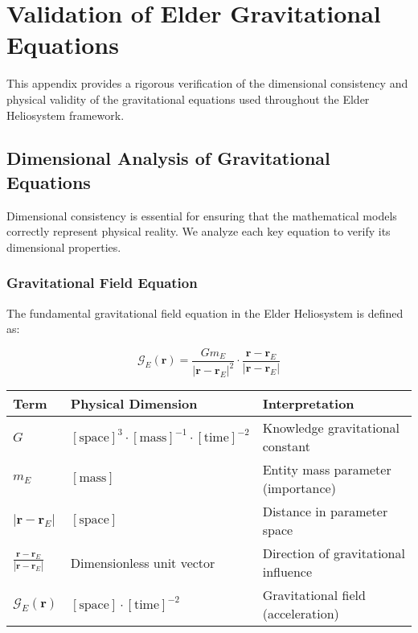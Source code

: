 \chapter{Validation of Elder Gravitational Equations}

This appendix provides a rigorous verification of the dimensional consistency and physical validity of the gravitational equations used throughout the Elder Heliosystem framework.

\section{Dimensional Analysis of Gravitational Equations}

Dimensional consistency is essential for ensuring that the mathematical models correctly represent physical reality. We analyze each key equation to verify its dimensional properties.

\subsection{Gravitational Field Equation}

The fundamental gravitational field equation in the Elder Heliosystem is defined as:

\begin{equation}
\mathcal{G}_E(\mathbf{r}) = \frac{G m_E}{|\mathbf{r} - \mathbf{r}_E|^2} \cdot \frac{\mathbf{r} - \mathbf{r}_E}{|\mathbf{r} - \mathbf{r}_E|}
\end{equation}

\begin{center}
\label{tab:dimensional_analysis_grav_field}
\begin{tabular}{p{3cm} p{5cm} p{6cm}}
\textbf{Term} & \textbf{Physical Dimension} & \textbf{Interpretation} \\
\hline
$G$ & $[\text{space}]^3 \cdot [\text{mass}]^{-1} \cdot [\text{time}]^{-2}$ & Knowledge gravitational constant \\
$m_E$ & $[\text{mass}]$ & Entity mass parameter (importance) \\
$|\mathbf{r} - \mathbf{r}_E|$ & $[\text{space}]$ & Distance in parameter space \\
$\frac{\mathbf{r} - \mathbf{r}_E}{|\mathbf{r} - \mathbf{r}_E|}$ & Dimensionless unit vector & Direction of gravitational influence \\
\hline
$\mathcal{G}_E(\mathbf{r})$ & $[\text{space}] \cdot [\text{time}]^{-2}$ & Gravitational field (acceleration) \\
\hline
\end{tabular}
\end{center}

